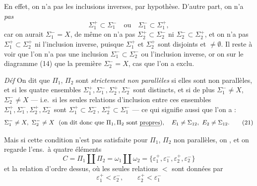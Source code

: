 \documentclass[11pt,a4paper]{article}
\begin{document}
En effet, on n'a pas les inclusions inverses, \ill{} par
hypothèse. D'autre part, on n'a \emph{pas}
\[
  \Sigma_{1}^{+}\subset\Sigma_{1}^{-}\quad\text{ou}\quad
  \Sigma_{1}^{-}\subset\Sigma_{1}^{+},
\]
car on aurait 
$\Sigma_{1}^{-}=X$, de même on n'a pas
$\Sigma_{2}^{+}\subset\Sigma_{2}^{-}$ ni $\Sigma_{2}^{-}\subset\Sigma_{2}^{+}$,
et on n'a pas $\Sigma_{1}^{+}\subset\Sigma_{2}^{+}$ ni l'inclusion inverse,
puisque $\Sigma_{1}^{+}$ et $\Sigma_{2}^{+}$ sont disjoints et
$\neq\emptyset$. Il reste à voir que l'on n'a pas une inclusion
$\Sigma_{1}^{-}\subset\Sigma_{2}^{-}$ ou l'inclusion inverse, or on
 sur le diagramme (14) que  la première
   
$\Sigma_{2}^{-}=X$, cas que l'on a exclu.

\emph{Déf} On dit que $\Pi_{1}$, $\Pi_{2}$ sont \emph{strictement non
parallèles} si elles sont non parallèles, et si les quatre ensembles
$\Sigma_{1}^{+},\Sigma_{1}^{-},\Sigma_{2}^{+},\Sigma_{2}^{-}$ sont
distincts, et si de plus $\Sigma_{1}^{-}\neq X$, $\Sigma_{2}^{-}\neq X$ —
i.e.\ si les seules relations d'inclusion entre ces ensembles
$\Sigma_{1}^{+},\Sigma_{1}^{-},\Sigma_{2}^{+},\Sigma_{2}^{-}$ sont
$\Sigma_{1}^{+}\subset\Sigma_{2}^{-}$, $\Sigma_{2}^{+}\subset\Sigma_{1}^{-}$ —
ce qui signifie aussi que l'on a :
\[
  \Sigma_{1}^{-}\neq X,\ \Sigma_{2}^{-}\neq X\ \ (\text{on dit donc que
  }\Pi_{1},\Pi_{2}\text{ sont \emph{propres}}),\quad
  E_{1}\neq\Sigma_{12},\ E_{2}\neq\Sigma_{12} .
  \tag{21}
\]

Mais si cette condition n'est pas satisfaite pour $\Pi_{1}$, $\Pi_{2}$ non
parallèles, on  \ill{}, et on regarde l'ens.\ à quatre
éléments
\[
  C=\Pi_{1}\amalg\Pi_{2}=\omega_{1}\amalg\omega_{2}=\{\varepsilon_{1}^{+},
  \varepsilon_{1}^{-},\varepsilon_{2}^{+},\varepsilon_{2}^{-}\}
  \tag{17}
\]
et la relation d'ordre dessus, où les seules relations $<$ sont données
par
\[
  \varepsilon_{1}^{+}<\varepsilon_{2}^{-},\qquad
  \varepsilon_{2}^{+}<\varepsilon_{1}^{-}
  \tag{22}
\]

\end{document}
